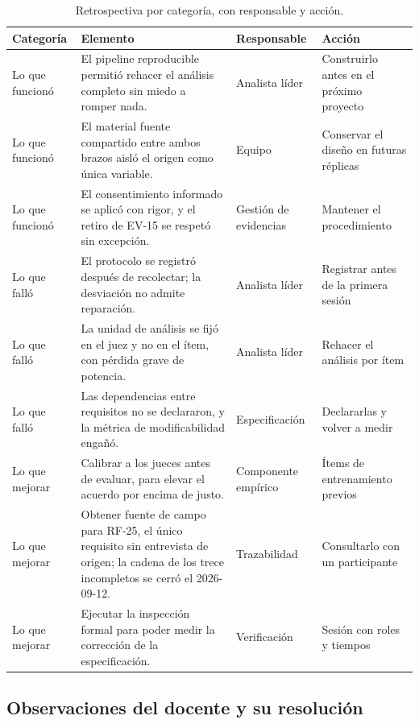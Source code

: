 \documentclass[11pt,a4paper]{article}
\begin{document}
\begin{table}[H]\centering\small
\caption{Retrospectiva por categor\'ia, con responsable y acci\'on.}
\label{tab:retrospectiva}
\begin{tabular}{p{2.4cm}p{6.6cm}p{2.6cm}p{2.6cm}}
\toprule
\textbf{Categor\'ia} & \textbf{Elemento} & \textbf{Responsable} & \textbf{Acci\'on} \\
\midrule
Lo que funcion\'o & El pipeline reproducible permiti\'o rehacer el an\'alisis completo sin miedo a romper nada. & Analista l\'ider & Construirlo antes en el pr\'oximo proyecto \\
Lo que funcion\'o & El material fuente compartido entre ambos brazos aisl\'o el origen como \'unica variable. & Equipo & Conservar el dise\~no en futuras r\'eplicas \\
Lo que funcion\'o & El consentimiento informado se aplic\'o con rigor, y el retiro de EV-15 se respet\'o sin excepci\'on. & Gesti\'on de evidencias & Mantener el procedimiento \\
Lo que fall\'o & El protocolo se registr\'o despu\'es de recolectar; la desviaci\'on no admite reparaci\'on. & Analista l\'ider & Registrar antes de la primera sesi\'on \\
Lo que fall\'o & La unidad de an\'alisis se fij\'o en el juez y no en el \'item, con p\'erdida grave de potencia. & Analista l\'ider & Rehacer el an\'alisis por \'item \\
Lo que fall\'o & Las dependencias entre requisitos no se declararon, y la m\'etrica de modificabilidad enga\~n\'o. & Especificaci\'on & Declararlas y volver a medir \\
Lo que mejorar & Calibrar a los jueces antes de evaluar, para elevar el acuerdo por encima de justo. & Componente emp\'irico & \'Items de entrenamiento previos \\
Lo que mejorar & Obtener fuente de campo para RF-25, el \'unico requisito sin entrevista de origen; la cadena de los trece incompletos se cerr\'o el 2026-09-12. & Trazabilidad & Consultarlo con un participante \\
Lo que mejorar & Ejecutar la inspecci\'on formal para poder medir la correcci\'on de la especificaci\'on. & Verificaci\'on & Sesi\'on con roles y tiempos \\
\bottomrule
\end{tabular}
\end{table}


\subsection*{Observaciones del docente y su resoluci\'on}
\label{anx:observaciones}
\end{document}
